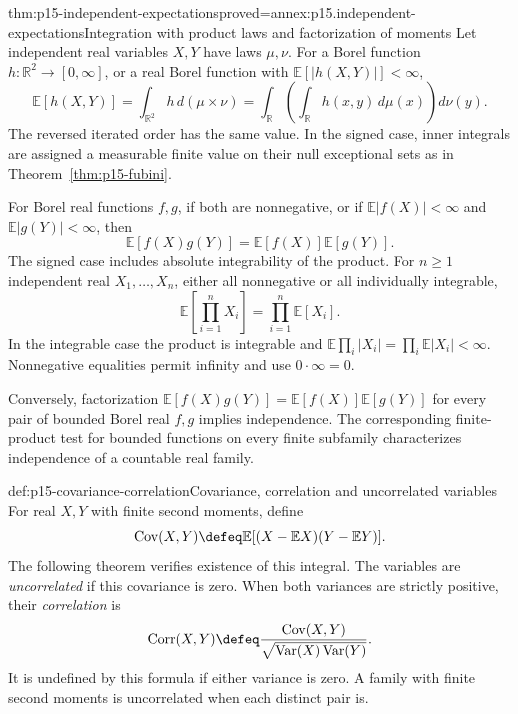 \begin{hbtheorem}{thm:p15-independent-expectations}{proved=annex:p15.independent-expectations}{Integration with product laws and factorization of moments}
Let independent real variables \(X,Y\) have laws \(\mu,\nu\).
For a Borel function \(h:\mathbb R^2\to[0,\infty]\), or a real
Borel function with \(\mathbb E[|h(X,Y)|]<\infty\),
\[
 \mathbb E[h(X,Y)]
      =\int_{\mathbb R^2}h\,d(\mu\times\nu)
      =\int_{\mathbb R}\left(\int_{\mathbb R}h(x,y)\,d\mu(x)\right)d\nu(y).
\]
The reversed iterated order has the same value. In the signed case,
inner integrals are assigned a measurable finite value on their null
exceptional sets as in Theorem~\ref{thm:p15-fubini}.

For Borel real functions \(f,g\), if both are nonnegative, or if
\(\mathbb E|f(X)|<\infty\) and \(\mathbb E|g(Y)|<\infty\), then
\[
 \mathbb E[f(X)g(Y)]=\mathbb E[f(X)]\mathbb E[g(Y)].
\]
The signed case includes absolute integrability of the product.
For \(n\geq1\) independent real \(X_1,\ldots,X_n\), either all nonnegative
or all individually integrable,
\[
 \mathbb E\left[\prod_{i=1}^nX_i\right]
                         =\prod_{i=1}^n\mathbb E[X_i].
\]
In the integrable case the product is integrable and
\(\mathbb E\prod_i|X_i|=\prod_i\mathbb E|X_i|<\infty\).
Nonnegative equalities permit infinity and use \(0\cdot\infty=0\).

Conversely, factorization \(\mathbb E[f(X)g(Y)]=
\mathbb E[f(X)]\mathbb E[g(Y)]\) for every pair of bounded Borel
real \(f,g\) implies independence. The corresponding finite-product
test for bounded functions on every finite subfamily characterizes
independence of a countable real family.
\end{hbtheorem}

\begin{hbdefinition}{def:p15-covariance-correlation}{Covariance, correlation and uncorrelated variables}
For real \(X,Y\) with finite second moments, define
\[
 \operatorname{Cov}(X,Y)\defeq
       \mathbb E[(X-\mathbb E X)(Y-\mathbb E Y)].
\]
The following theorem verifies existence of this integral. The variables
are \emph{uncorrelated} if this covariance is zero. When both variances
are strictly positive, their \emph{correlation} is
\[
 \operatorname{Corr}(X,Y)\defeq
 \frac{\operatorname{Cov}(X,Y)}
      {\sqrt{\operatorname{Var}(X)\operatorname{Var}(Y)}}.
\]
It is undefined by this formula if either variance is zero. A family
with finite second moments is uncorrelated when each distinct pair is.
\end{hbdefinition}

